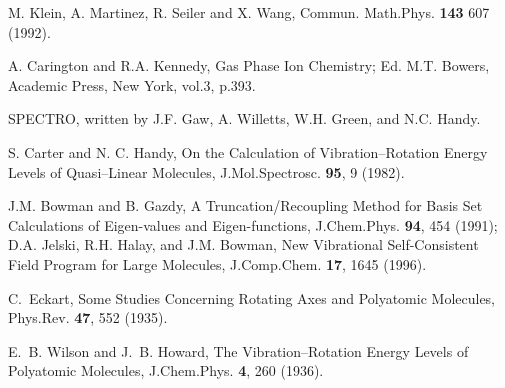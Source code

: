 \begin{thebibliography}{999}
 M. Klein, A. Martinez, R. Seiler and X. Wang, Commun.
Math.Phys. {\bf 143}  607 (1992).

A. Carington and R.A. Kennedy, Gas Phase Ion Chemistry;
Ed. M.T. Bowers, Academic Press, New York, vol.3, p.393.


SPECTRO, written by J.F. Gaw, A. Willetts, W.H. Green, and N.C. Handy.

S. Carter and N. C. Handy, 
On the Calculation of Vibration--Rotation Energy Levels of
Quasi--Linear Molecules,
J.Mol.Spectrosc. {\bf 95}, 9 (1982).

J.M. Bowman and B. Gazdy, 
A Truncation/Recoupling Method for Basis Set Calculations of
Eigen-values and Eigen-functions,
J.Chem.Phys.
{\bf 94}, 454 (1991);
D.A. Jelski, R.H. Halay, and J.M. Bowman,
New Vibrational Self-Consistent Field Program
for Large Molecules,
J.Comp.Chem. {\bf 17}, 1645 (1996).













C.~Eckart,
Some Studies Concerning Rotating Axes and Polyatomic
Molecules,
\newblock Phys.Rev. {\bf 47}, 552 (1935).

E.~B. Wilson and J.~B. Howard,
The Vibration--Rotation Energy Levels
of Polyatomic Molecules,
\newblock J.Chem.Phys. {\bf 4}, 260 (1936).


\end{thebibliography}
